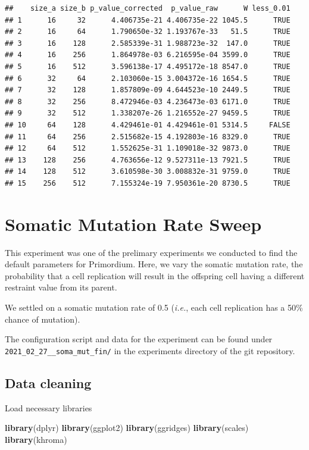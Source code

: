\documentclass[]{book}
\newenvironment{Shaded}{\begin{snugshade}}{\end{snugshade}}
\newcommand{\KeywordTok}[1]{\textcolor[rgb]{0.13,0.29,0.53}{\textbf{#1}}}
\newcommand{\NormalTok}[1]{#1}
\begin{document}
\begin{verbatim}
##    size_a size_b p_value_corrected  p_value_raw      W less_0.01
## 1      16     32      4.406735e-21 4.406735e-22 1045.5      TRUE
## 2      16     64      1.790650e-32 1.193767e-33   51.5      TRUE
## 3      16    128      2.585339e-31 1.988723e-32  147.0      TRUE
## 4      16    256      1.864978e-03 6.216595e-04 3599.0      TRUE
## 5      16    512      3.596138e-17 4.495172e-18 8547.0      TRUE
## 6      32     64      2.103060e-15 3.004372e-16 1654.5      TRUE
## 7      32    128      1.857809e-09 4.644523e-10 2449.5      TRUE
## 8      32    256      8.472946e-03 4.236473e-03 6171.0      TRUE
## 9      32    512      1.338207e-26 1.216552e-27 9459.5      TRUE
## 10     64    128      4.429461e-01 4.429461e-01 5314.5     FALSE
## 11     64    256      2.515682e-15 4.192803e-16 8329.0      TRUE
## 12     64    512      1.552625e-31 1.109018e-32 9873.0      TRUE
## 13    128    256      4.763656e-12 9.527311e-13 7921.5      TRUE
## 14    128    512      3.610598e-30 3.008832e-31 9759.0      TRUE
## 15    256    512      7.155324e-19 7.950361e-20 8730.5      TRUE
\end{verbatim}

\hypertarget{somatic-mutation-rate-sweep}{%
\chapter{Somatic Mutation Rate Sweep}\label{somatic-mutation-rate-sweep}}

This experiment was one of the prelimary experiments we conducted to find the default parameters for Primordium.
Here, we vary the somatic mutation rate, the probability that a cell replication will result in the offspring cell having a different restraint value from its parent.

We settled on a somatic mutation rate of 0.5 (\emph{i.e.}, each cell replication has a 50\% chance of mutation).

The configuration script and data for the experiment can be found under \texttt{2021\_02\_27\_\_soma\_mut\_fin/} in the experiments directory of the git repository.

\hypertarget{data-cleaning-1}{%
\section{Data cleaning}\label{data-cleaning-1}}

Load necessary libraries

\begin{Shaded}
\begin{Highlighting}[]
\KeywordTok{library}\NormalTok{(dplyr)}
\KeywordTok{library}\NormalTok{(ggplot2)}
\KeywordTok{library}\NormalTok{(ggridges)}
\KeywordTok{library}\NormalTok{(scales)}
\KeywordTok{library}\NormalTok{(khroma)}
\end{Highlighting}
\end{Shaded}
\end{document}
